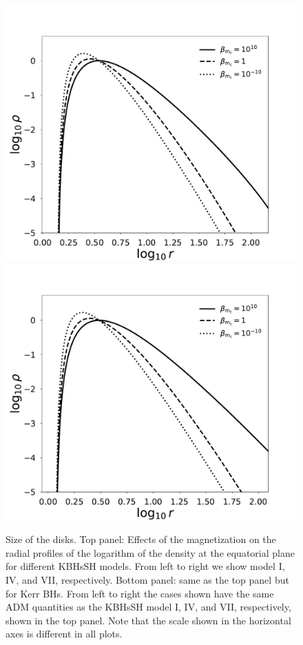 \documentclass[twocolumn,aps,showpacs,showkeys,prd,superscriptaddress,byrevtex, amsmath]{revtex4-1}
\begin{document}
\begin{figure}
\includegraphics[scale=0.22]{figures/log_radial_log_rho_IV_ADM.pdf}
\hspace{-0.6cm}
\includegraphics[scale=0.22]{figures/log_radial_log_rho_VII_ADM.pdf}
\hspace{-0.6cm}
\caption{Size of the disks. Top panel: Effects of the magnetization on the radial profiles of the logarithm of the density at the equatorial plane for different KBHsSH models. From left to right we show model I, IV, and VII, respectively. Bottom panel: same as the top panel but for Kerr BHs. From left to right the cases shown have the same ADM quantities as the KBHsSH model I, IV, and VII, respectively, shown in the top panel. Note that the scale shown in the horizontal axes is different in all plots.}
\label{radial_profiles}
\end{figure}
\end{document}

